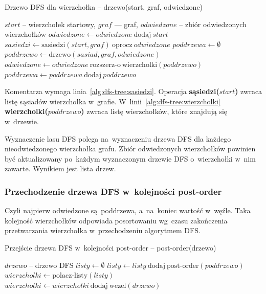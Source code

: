\documentclass[a4paper,12pt]{mwart}
\begin{document}
\begin{algorithm}[H]
\caption{Drzewo DFS dla wierzchołka -- drzewo(start, graf, odwiedzone)}
\begin{algorithmic}[1]
\Require $start$ -- wierzchołek startowy, $graf$ --- graf, $odwiedzone$ -- zbiór odwiedzonych wierzchołków
\State {}
\Else
\State $odwiedzone \gets odwiedzone \ \text{dodaj} \ start$
\State $sasiedzi \gets \text{sasiedzi}(start, graf) \ \text{oprocz} \ odwiedzone$ \label{alg:dfs-tree:sasiedzi}
\State $poddrzewa \gets \emptyset$
\State $poddrzewo \gets \text{drzewo}(sasiad, graf, odwiedzone)$ 
\State $odwiedzone \gets odwiedzone \ \text{rozszerz-o} \ \text{wierzcholki}(poddrzewo)$ \label{alg:dfs-tree:wierzcholki}
\State $poddrzewa \gets poddrzewa \ \text{dodaj} \ poddrzewo$
\EndFor
\State {}
\EndIf
\end{algorithmic}
\end{algorithm}

Komentarza wymaga linia~\ref{alg:dfs-tree:sasiedzi}. Operacja
\textbf{sąsiedzi($start$)} zwraca listę sąsiadów wierzchołka w~grafie.
W~linii~\ref{alg:dfs-tree:wierzcholki} \textbf{wierzcholki($poddrzewo$)} zwraca
listę wierzchołków, które znajdują się w~drzewie.

Wyznaczenie lasu DFS polega na~wyznaczeniu drzewa DFS dla każdego
nieodwiedzonego wierzchołka grafu. Zbiór odwiedzonych wierzchołków powinien być
aktualizowany po~każdym wyznaczonym drzewie DFS o~wierzchołki w~nim zawarte.
Wynikiem jest lista drzew.

\subsubsection{Przechodzenie drzewa DFS w~kolejności post-order}

Czyli najpierw odwiedzone są~poddrzewa, a~na~koniec wartość w~węźle. Taka
kolejność wierzchołków odpowiada posortowaniu wg~czasu zakończenia
przetwarzania wierzchołka w~przechodzeniu algorytmem DFS.

\begin{algorithm}[H]
\caption{Przejście drzewa DFS w~kolejności post-order -- post-order(drzewo)}
\begin{algorithmic}[1]
\Require $drzewo$ -- drzewo DFS
\State $listy \gets \emptyset$
\State $listy \gets listy \ \text{dodaj} \ \text{post-order}(poddrzewo)$
\EndFor
\State $wierzcholki \gets \text{polacz-listy}(listy)$
\State $wierzcholki \gets wierzcholki \ \text{dodaj} \ \text{wezel}(drzewo)$
\State {}
\end{algorithmic}
\end{algorithm}
\end{document}
